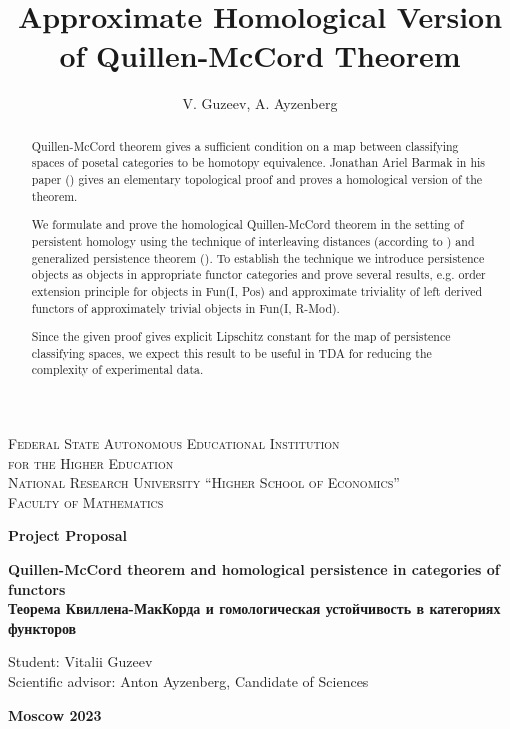 \documentclass[a4paper, 12pt]{article}
\title{Approximate Homological Version of Quillen-McCord Theorem}
\author{V. Guzeev, A. Ayzenberg}
\numberwithin{equation}{section}
\theoremstyle{definition}
\theoremstyle{remark}
\begin{document}
\begin{center}
{\scshape Federal State Autonomous Educational Institution\\
for the Higher Education\\
National Research University ``Higher School of Economics''\\[1ex]
Faculty of Mathematics\par}

\par\vfill


\textbf{\large Project Proposal}

\vspace{1cm}

{\Large\bfseries
Quillen-McCord theorem and homological persistence in categories of functors\\
\vspace{0.5cm}
Теорема Квиллена-МакКорда и гомологическая устойчивость в категориях функторов\par}

\vspace{3cm}

\begin{flushright}
\large Student: Vitalii Guzeev\\
\vspace{0.5cm}
\large Scientific advisor: Anton Ayzenberg, Candidate of Sciences
\end{flushright}

\par\vfill\vfill
\textbf{\large Moscow 2023}
\end{center}
\thispagestyle{empty}
\pagebreak

\begin{abstract}
Quillen-McCord theorem gives a sufficient condition on a map between classifying spaces of posetal categories to be homotopy equivalence. Jonathan Ariel Barmak in his paper ({\cite{Bar11}}) gives an elementary topological proof and proves a homological version of the theorem.

We formulate and prove the homological Quillen-McCord theorem in the setting of persistent homology using the technique of interleaving distances (according to {\cite{GS16}}) and generalized persistence theorem ({\cite{Corbet18}}). To establish the technique we introduce persistence objects as objects in appropriate functor categories and prove several results, e.g. order extension principle for objects in Fun(I, Pos) and approximate triviality of left derived functors of approximately trivial objects in Fun(I, R-Mod).

Since the given proof gives explicit Lipschitz constant for the map of persistence classifying spaces, we expect this result to be useful in TDA for reducing the complexity of experimental data.
\end{abstract}
\end{document}
